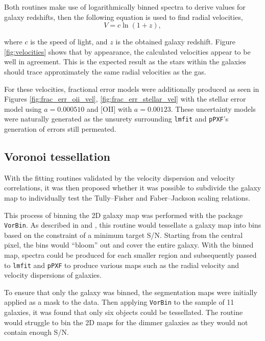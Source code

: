 \documentclass[12pt, twocolumn, nofootinbib]{revtex4-1}    %
\begin{document}
Both routines make use of logarithmically binned spectra to derive values for galaxy redshifts, then the following equation is used to find radial velocities,
\begin{equation}
    V=c\ln(1+z),
\end{equation}

where $c$ is the speed of light, and $z$ is the obtained galaxy redshift. Figure \ref{fig:velocities} shows that by appearance, the calculated velocities appear to be well in agreement. This is the expected result as the stars within the galaxies should trace approximately the same radial velocities as the gas. 

For these velocities, fractional error models were additionally produced as seen in Figures \ref{fig:frac_err_oii_vel}, \ref{fig:frac_err_stellar_vel} with the stellar error model using $a=0.000510$ and [OII] with $a=0.00123$. These uncertainty models were naturally generated as the unsurety surrounding \texttt{lmfit} and \texttt{pPXF}'s generation of errors still permeated.

\vspace{2ex} %
\subsection{Voronoi tessellation}
\noindent
With the fitting routines validated by the velocity dispersion and velocity correlations, it was then proposed whether it was possible to subdivide the galaxy map to individually test the Tully--Fisher and Faber--Jackson scaling relations.

This process of binning the 2D galaxy map was performed with the package \texttt{VorBin}. As described in \cite{2003MNRAS.342..345C} and \cite{2009arXiv0912.1303C}, this routine would tessellate a galaxy map into bins based on the constraint of a minimum target S/N. Starting from the central pixel, the bins would ``bloom'' out and cover the entire galaxy. With the binned map, spectra could be produced for each smaller region and subsequently passed to \texttt{lmfit} and \texttt{pPXF} to produce various maps such as the radial velocity and velocity dispersions of galaxies.

To ensure that only the galaxy was binned, the segmentation maps were initially applied as a mask to the data. Then applying \texttt{VorBin} to the sample of 11 galaxies, it was found that only six objects could be tessellated. The routine would struggle to bin the 2D maps for the dimmer galaxies as they would not contain enough S/N. 
\end{document}
